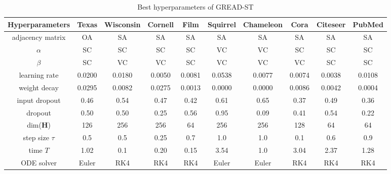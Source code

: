 \documentclass{article}
\theoremstyle{plain}
\theoremstyle{definition}
\theoremstyle{remark}
\begin{document}
\begin{table*}[ht!]
    \centering
    \small
    \caption{Best hyperparameters of GREAD-ST}
    \label{tab:best_ST}
    \begin{tabular}{c ccccccccc} \toprule
        Hyperparameters  & Texas  & Wisconsin 
                                          & Cornell& Film   & Squirrel 
                                                                      & Chameleon
                                                                               & Cora   & Citeseer 
                                                                                                 & PubMed\\ \midrule
        adjacency matrix & OA     & SA     & SA     & SA     & SA     & SA     & SA     & SA     & SA    \\
        $\alpha$         & SC     & SC     & SC     & SC     & VC     & VC     & SC     & SC     & SC    \\
        $\beta$          & SC     & VC     & VC     & SC     & VC     & VC     & VC     & SC     & SC    \\
        learning rate    & 0.0200 & 0.0180 & 0.0050 & 0.0081 & 0.0538 & 0.0077 & 0.0074 & 0.0038 & 0.0108\\
        weight decay     & 0.0295 & 0.0082 & 0.0275 & 0.0013 & 0.0000 & 0.0000 & 0.0086 & 0.0042 & 0.0004\\
        input dropout    & 0.46   & 0.54   & 0.47   & 0.42   & 0.61   & 0.65   & 0.37   & 0.49   & 0.36  \\
        dropout          & 0.50   & 0.50   & 0.25   & 0.56   & 0.95   & 0.09   & 0.41   & 0.54   & 0.22  \\
        dim($\mathbf{H}$)& 126    & 256    & 256    & 64     & 256    & 256    & 128    & 64     & 64    \\
        step size $\tau$ & 0.5    & 0.5    & 0.25   & 0.7    & 1.0    & 1.0    & 0.1    & 0.6    & 0.9   \\
        time $T$         & 1.02   & 0.1    & 0.20   & 0.15   & 3.54   & 1.0    & 3.04   & 2.37   & 1.28  \\
        ODE solver       & Euler  & RK4    & RK4    & RK4    & Euler  & Euler  & RK4    & RK4    & RK4   \\
        \bottomrule
    \end{tabular}
\end{table*}
\end{document}
